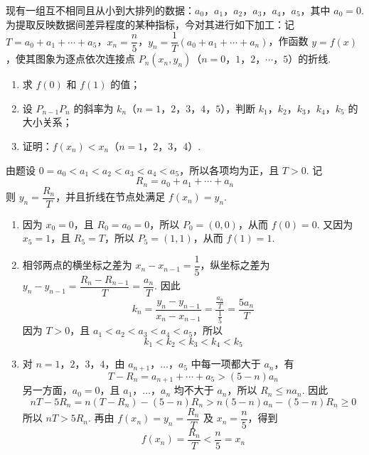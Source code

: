\begin{problem}
现有一组互不相同且从小到大排列的数据：\(a_0\)，\(a_1\)，\(a_2\)，\(a_3\)，\(a_4\)，\(a_5\)，其中 \(a_0=0\). 为提取反映数据间差异程度的某种指标，今对其进行如下加工：记 \(T=a_0+a_1+\cdots+a_5\)，\(x_n=\dfrac{n}{5}\)，\(y_n=\dfrac{1}{T}(a_0+a_1+\cdots+a_n)\)，作函数 \(y=f(x)\)，使其图象为逐点依次连接点 \(P_n(x_n,y_n)\)（\(n=0\)，\(1\)，\(2\)，\(\cdots\)，\(5\)）的折线.

\begin{enumerate}
\item 求 \(f(0)\) 和 \(f(1)\) 的值；
\item 设 \(P_{n-1}P_n\) 的斜率为 \(k_n\)（\(n=1\)，\(2\)，\(3\)，\(4\)，\(5\)），判断 \(k_1\)，\(k_2\)，\(k_3\)，\(k_4\)，\(k_5\) 的大小关系；
\item 证明：\(f(x_n)<x_n\)（\(n=1\)，\(2\)，\(3\)，\(4\)）.
\end{enumerate}
\end{problem}

\begin{solution}
由题设 \(0=a_0<a_1<a_2<a_3<a_4<a_5\)，所以各项均为正，且 \(T>0\). 记
\[
R_n=a_0+a_1+\cdots+a_n
\]
则 \(y_n=\dfrac{R_n}{T}\)，并且折线在节点处满足 \(f(x_n)=y_n\).

\begin{enumerate}
\item 因为 \(x_0=0\)，且 \(R_0=a_0=0\)，所以 \(P_0=(0,0)\)，从而 \(f(0)=0\). 又因为 \(x_5=1\)，且 \(R_5=T\)，所以 \(P_5=(1,1)\)，从而 \(f(1)=1\).
\item 相邻两点的横坐标之差为 \(x_n-x_{n-1}=\dfrac15\)，纵坐标之差为 \(y_n-y_{n-1}=\dfrac{R_n-R_{n-1}}{T}=\dfrac{a_n}{T}\). 因此
\[
k_n=\frac{y_n-y_{n-1}}{x_n-x_{n-1}}=\frac{\frac{a_n}{T}}{\frac15}=\frac{5a_n}{T}
\]
因为 \(T>0\)，且 \(a_1<a_2<a_3<a_4<a_5\)，所以
\[
k_1<k_2<k_3<k_4<k_5
\]
\item 对 \(n=1\)，\(2\)，\(3\)，\(4\)，由 \(a_{n+1}\)，\(\ldots\)，\(a_5\) 中每一项都大于 \(a_n\)，有
\[
T-R_n=a_{n+1}+\cdots+a_5>(5-n)a_n
\]
另一方面，\(a_0=0\)，且 \(a_1\)，\(\ldots\)，\(a_n\) 均不大于 \(a_n\)，所以 \(R_n\leq na_n\). 因此
\[
nT-5R_n=n(T-R_n)-(5-n)R_n>n(5-n)a_n-(5-n)R_n\geq0
\]
所以 \(nT>5R_n\). 再由 \(f(x_n)=y_n=\dfrac{R_n}{T}\) 及 \(x_n=\dfrac n5\)，得到
\[
f(x_n)=\frac{R_n}{T}<\frac n5=x_n
\]
\end{enumerate}
\end{solution}
